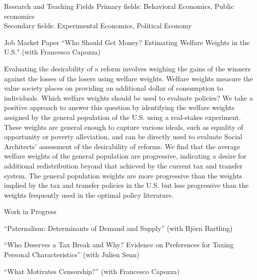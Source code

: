 \documentclass{resume} %
\begin{document}
\begin{rSection}{Research and Teaching Fields}
  Primary fields: Behavioral Economics, Public economics \\
  Secondary fields: Experimental Economics, Political Economy
\end{rSection}


\begin{rSection}{Job Market Paper}
    ``Who Should Get Money? Estimating Welfare Weights in the U.S." (with Francesco Capozza) 

    Evaluating the desirability of a reform involves weighing the gains of the winners against the losses of the losers using welfare weights. Welfare weights measure the value society places on providing an additional dollar of consumption to individuals. Which welfare weights should be used to evaluate policies? We take a positive approach to answer this question by identifying the welfare weights assigned by the general population of the U.S. using a real-stakes experiment. These weights are general enough to capture various ideals, such as equality of opportunity or poverty alleviation, and can be directly used to evaluate Social Architects' assessment of the desirability of reforms. We find that the average welfare weights of the general population are progressive, indicating a desire for additional redistribution beyond that achieved by the current tax and transfer system. The general population weights are more progressive than the weights implied by the tax and transfer policies in the U.S. but less progressive than the weights frequently used in the optimal policy literature.
\end{rSection}


\begin{rSection}{Work in Progress}
  
  ``Paternalism: Determinants of Demand and Supply” (with Bj\"{o}rn Bartling)

  ``Who Deserves a Tax Break and Why? Evidence on
  Preferences for Taxing Personal Characteristics” (with Julien Senn) 

  ``What Motivates Censorship?” (with Francesco Capozza)
\end{rSection}

\newpage 
\end{document}

